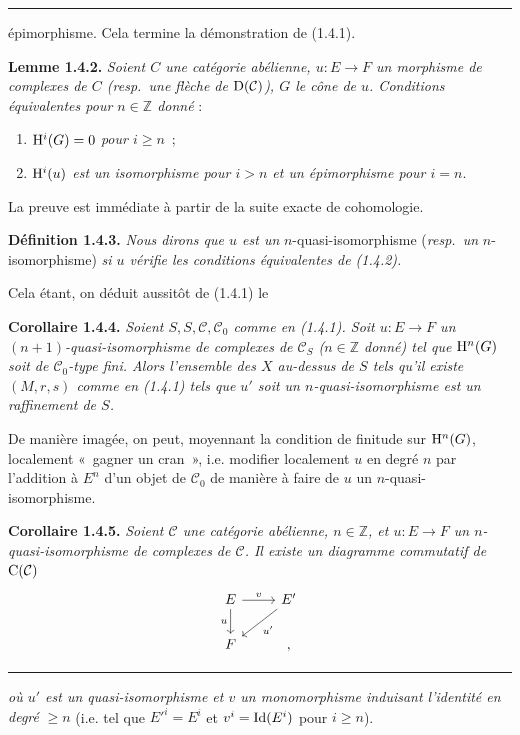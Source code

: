 \documentclass[11pt]{article}
\begin{document}
\medskip\hrule\medskip

épimorphisme. Cela termine la démonstration de (1.4.1).

\textbf{Lemme 1.4.2.} \emph{Soient \(C\) une catégorie abélienne, \(u:E\to F\) un morphisme de complexes de \(C\) (resp.\ une flèche de \(\mathrm D(\mathcal C)\)), \(G\) le cône de \(u\). Conditions équivalentes pour \(n\in\mathbb Z\) donné} :
\begin{enumerate}[label=(\roman*)]
\item \emph{\(\mathrm H^i(G)=0\) pour \(i\geq n\)}~;
\item \emph{\(\mathrm H^i(u)\) est un isomorphisme pour \(i>n\) et un épimorphisme pour \(i=n\)}.
\end{enumerate}
La preuve est immédiate à partir de la suite exacte de cohomologie.

\textbf{Définition 1.4.3.} \emph{Nous dirons que \(u\) est un} \(n\)-quasi-isomorphisme (\emph{resp.\ un} \(n\)-isomorphisme) \emph{si \(u\) vérifie les conditions équivalentes de (1.4.2).}

Cela étant, on déduit aussitôt de (1.4.1) le

\textbf{Corollaire 1.4.4.} \emph{Soient \(S,S,\mathcal C,\mathcal C_0\) comme en (1.4.1). Soit \(u:E\to F\) un \((n+1)\)-quasi-isomorphisme de complexes de \(\mathcal C_S\) (\(n\in\mathbb Z\) donné) tel que \(\mathrm H^n(G)\) soit de \(\mathcal C_0\)-type fini. Alors l'ensemble des \(X\) au-dessus de \(S\) tels qu'il existe \((M,r,s)\) comme en (1.4.1) tels que \(u'\) soit un \(n\)-quasi-isomorphisme est un raffinement de \(S\).}

De manière imagée, on peut, moyennant la condition de finitude sur \(\mathrm H^n(G)\), localement «~gagner un cran~», i.e. modifier localement \(u\) en degré \(n\) par l'addition à \(E^n\) d'un objet de \(\mathcal C_0\) de manière à faire de \(u\) un \(n\)-quasi-isomorphisme.

\textbf{Corollaire 1.4.5.} \emph{Soient \(\mathcal C\) une catégorie abélienne, \(n\in\mathbb Z\), et \(u:E\to F\) un \(n\)-quasi-isomorphisme de complexes de \(\mathcal C\). Il existe un diagramme commutatif de \(\mathrm C(\mathcal C)\)}
\[
\begin{tikzcd}
E \arrow[r,"v"] \arrow[d,"u"'] & E' \arrow[dl,"u'"]\\
F & ,
\end{tikzcd}
\]


\medskip\hrule\medskip

\emph{où \(u'\) est un
quasi-isomorphisme et \(v\) un monomorphisme induisant l'identité en degré} \(\geq n\) (i.e. tel que \(E'^i=E^i\) et \(v^i=\operatorname{Id}(E^i)\) pour \(i\geq n\)).
\end{document}
